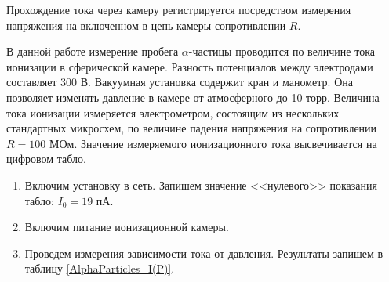 	Прохождение тока через камеру регистрируется посредством измерения напряжения на включенном в цепь камеры сопротивлении $R$.

	В данной работе измерение пробега $\alpha$-частицы проводится по величине тока ионизации в сферической камере. Разность потенциалов между электродами составляет 300 В. Вакуумная установка содержит кран и манометр. Она позволяет изменять давление в камере от атмосферного до 10 торр. Величина тока ионизации измеряется электрометром, состоящим из нескольких стандартных микросхем, по величине падения напряжения на сопротивлении $R = 100$ МОм. Значение измеряемого ионизационного тока высвечивается на цифровом табло.

	
	\begin{enumerate}
		\item Включим установку в сеть. Запишем значение <<нулевого>> показания табло: $I_0 = 19$ пА.
		
		\item Включим питание ионизационной камеры.
		
		\item Проведем измерения зависимости тока от давления. Результаты запишем в таблицу \ref{AlphaParticles_I(P)}.
	

\end{enumerate}
